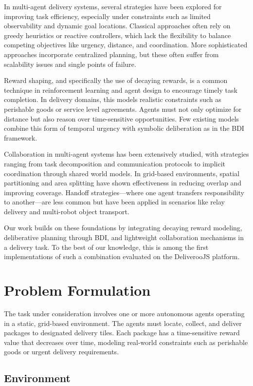 \documentclass[conference]{IEEEtran}
\begin{document}
In multi-agent delivery systems, several strategies have been explored for improving task efficiency, especially under constraints such as limited observability and dynamic goal locations. Classical approaches often rely on greedy heuristics or reactive controllers, which lack the flexibility to balance competing objectives like urgency, distance, and coordination. More sophisticated approaches incorporate centralized planning, but these often suffer from scalability issues and single points of failure.

Reward shaping, and specifically the use of decaying rewards, is a common technique in reinforcement learning and agent design to encourage timely task completion. In delivery domains, this models realistic constraints such as perishable goods or service level agreements. Agents must not only optimize for distance but also reason over time-sensitive opportunities. Few existing models combine this form of temporal urgency with symbolic deliberation as in the BDI framework.

Collaboration in multi-agent systems has been extensively studied, with strategies ranging from task decomposition and communication protocols to implicit coordination through shared world models. In grid-based environments, spatial partitioning and area splitting have shown effectiveness in reducing overlap and improving coverage. Handoff strategies—where one agent transfers responsibility to another—are less common but have been applied in scenarios like relay delivery and multi-robot object transport.

Our work builds on these foundations by integrating decaying reward modeling, deliberative planning through BDI, and lightweight collaboration mechanisms in a delivery task. To the best of our knowledge, this is among the first implementations of such a combination evaluated on the DeliverooJS platform.

\section{Problem Formulation}

The task under consideration involves one or more autonomous agents operating in a static, grid-based environment. The agents must locate, collect, and deliver packages to designated delivery tiles. Each package has a time-sensitive reward value that decreases over time, modeling real-world constraints such as perishable goods or urgent delivery requirements.

\subsection{Environment}
\end{document}
